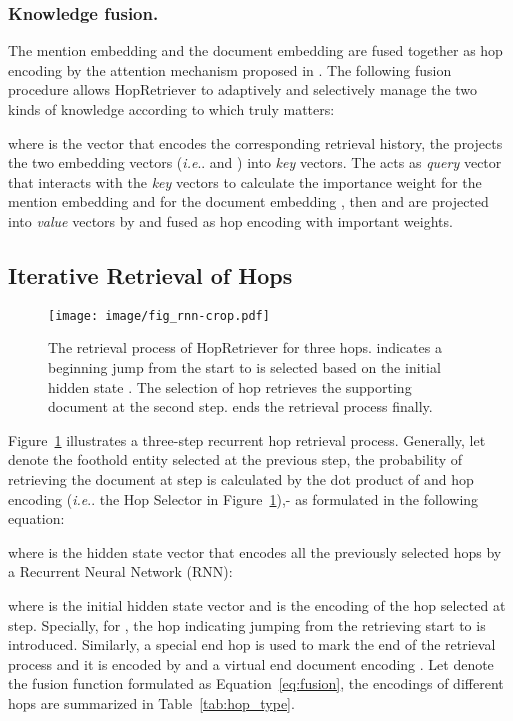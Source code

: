 \documentclass[letterpaper]{article} \usepackage{aaai21}  \usepackage{times}  \usepackage{helvet} \usepackage{courier}  \usepackage[hyphens]{url}  \usepackage{graphicx} \urlstyle{rm} \def\UrlFont{\rm}  \usepackage{graphicx}  \usepackage{natbib}  \usepackage{caption} \frenchspacing  \setlength{\pdfpagewidth}{8.5in}  \setlength{\pdfpageheight}{11in}
\makeatletter
\DeclareRobustCommand\onedot{\futurelet\@let@token\@onedot}
\def\@onedot{\ifx\@let@token.\else.\null\fi\xspace}
\def\ie{\emph{i.e}\onedot} \def\Ie{\emph{I.e}\onedot}
\makeatother
\begin{document}
\subsubsection{Knowledge fusion.}
The mention embedding  and the document embedding  are fused together as hop encoding  by the attention mechanism proposed in \citet{sukhbaatar2015end}. The following fusion procedure allows HopRetriever to adaptively and selectively manage the two kinds of knowledge according to which truly matters: 


where  is the vector that encodes the corresponding retrieval history, the  projects the two embedding vectors (\ie  and ) into \textit{key} vectors. The  acts as \textit{query} vector that interacts with the \textit{key} vectors to calculate the importance weight  for the mention embedding  and  for the document embedding , then  and  are projected into \textit{value} vectors by  and fused as hop encoding with important weights.


\subsection{Iterative Retrieval of Hops}

\begin{figure}[h]
    \centering
    \texttt{[image: image/fig\_rnn-crop.pdf]}
    \caption{The retrieval process of HopRetriever for three hops.  indicates a beginning jump from the start to  is selected based on the initial hidden state . The selection of hop  retrieves the supporting document  at the second step.  ends the retrieval process finally.}
    \label{fig:rnn}
\end{figure}
Figure~\ref{fig:rnn} illustrates a three-step recurrent hop retrieval process. Generally, let  denote the foothold entity selected at the previous  step, the probability of retrieving the document  at  step is calculated by the dot product of  and hop encoding  (\ie the Hop Selector in Figure~\ref{fig:rnn}),- as formulated in the following equation:

\noindent
where  is the hidden state vector that encodes all the previously selected hops by a Recurrent Neural Network (RNN): 

where  is the initial hidden state vector and  is the encoding of the hop selected at  step. Specially, for , the hop  indicating jumping from the retrieving start to  is introduced. Similarly, a special end hop  is used to mark the end of the retrieval process and it is encoded by  and a virtual end document encoding . Let  denote the fusion function formulated as Equation~\eqref{eq:fusion}, the encodings of different hops are summarized in Table~\ref{tab:hop_type}.
\end{document}
